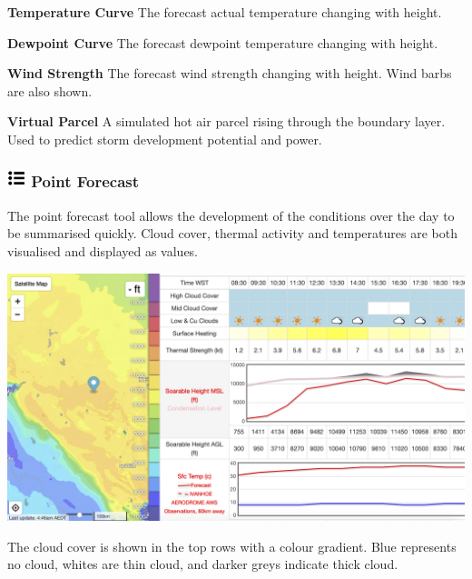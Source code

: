 \documentclass[9pt,a4paper,twocolumn]{article}
\begin{document}
\begin{arrow_red}
\item \textbf{Temperature Curve} The forecast actual temperature changing with height.
\end{arrow_red}
\begin{arrow_green}
\item \textbf{Dewpoint Curve} The forecast dewpoint temperature changing with height.
\end{arrow_green}
\begin{arrow_blue}
\item \textbf{Wind Strength} The forecast wind strength changing with height. Wind barbs are also shown.
\end{arrow_blue}
\begin{arrow_pink}
\item \textbf{Virtual Parcel} A simulated hot air parcel rising through the boundary layer. Used to predict storm development potential and power.
\end{arrow_pink}

\subsubsection*{\includegraphics[height=15pt]{images/icons/point_forecast.png} Point Forecast}

The point forecast tool allows the development of the conditions over the day to be summarised quickly. Cloud cover, thermal activity and temperatures are both visualised and displayed as values.

\includegraphics[width=\linewidth]{images/point_forecast.png}

The cloud cover is shown in the top rows with a colour gradient. Blue represents no cloud, whites are thin cloud, and darker greys indicate thick cloud.
\end{document}
